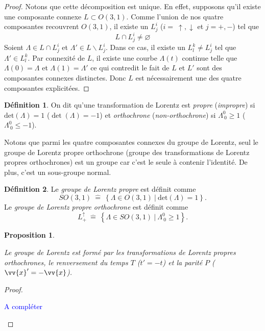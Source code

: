 \documentclass[a4paper,11pt]{report}
\theoremstyle{definition}
\theoremstyle{plain}
\newtheorem{prop}[thm]{Proposition}
\theoremstyle{definition}
\newtheorem{defn}{Définition}[chapter]
\theoremstyle{remark}
\newcommand{\comp}{\begin{center}\textcolor{blue}{A compléter}\end{center}}
\begin{document}
\begin{proof}
                Notons que cette décomposition est unique. En effet, supposons qu'il existe une composante connexe $L \subset O(3, 1)$. Comme l'union de nos quatre composantes recouvrent $O(3, 1)$, il existe un $L^i_j$ ($i = ~\uparrow, \downarrow$ et $j = +, -$) tel que 
                \begin{equation}
                    L \cap L^i_j \neq \varnothing
                \end{equation}
                Soient $\Lambda \in L \cap L^i_j $ et $\Lambda' \in L\backslash L^i_j$. Dans ce cas, il existe un $L^k_l \neq L^i_j$ tel que $\Lambda' \in L^k_l$. Par connexité de $L$, il existe une courbe $\Lambda(t)$ continue telle que $\Lambda(0) = \Lambda$ et $\Lambda(1) = \Lambda'$
                ce qui contredit le fait de $L$ et $L'$ sont des composantes connexes distinctes.
                Donc $L$ est nécessairement une des quatre composantes explicitées.
            \end{proof}
            \begin{defn}
                On dit qu'une transformation de Lorentz est \textit{propre} (\textit{impropre}) si $\text{det}(\Lambda) = 1$ ($\det(\Lambda) = -1$) et \textit{orthochrone} (\textit{non-orthochrone}) si $\Lambda^0_{~0}\geq1$ ($\Lambda^0_{~0}\leq-1$). 
            \end{defn}
            Notons que parmi les quatre composantes connexes du groupe de Lorentz, seul le groupe de Lorentz propre orthochrone (groupe des transformations de Lorentz propres orthochrones) est un groupe car c'est le seule à contenir l'identité. De plus, c'est un sous-groupe normal.
            
            \begin{defn}
                Le \textit{groupe de Lorentz propre} est définit comme
                $$SO(3,1) ~\hat{=}~ \left\{\Lambda\in O(3,1)~\big|~\text{det}(\Lambda) = 1\right\}.$$
                 Le \textit{groupe de Lorentz propre orthochrone} est définit comme
                $$L^\uparrow_+ ~\hat{=}~ \left\{\Lambda\in SO(3,1)~\big|~\Lambda^0_{~0}\geq1\right\}.$$
            \end{defn}
            
            \begin{prop}\begin{leftbar}
                Le groupe de Lorentz est formé par les transformations de Lorentz propres orthochrones, le renversement du temps $T$ ($t'= -t$) et la parité $P$ ($\vv{x}' = -\vv{x}$).
            \end{leftbar}\end{prop}
            \begin{proof}${}$\\
                \comp
            \end{proof}
            
\end{document}
